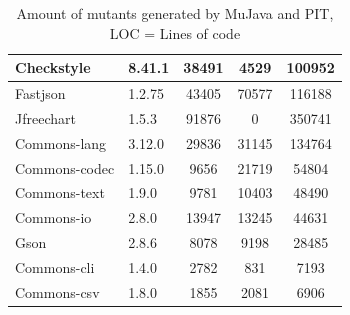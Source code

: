 \documentclass[conference,draftclsnofoot,onecolumn]{IEEEtran}
\begin{document}
\begin{table}[ht]
\begin{tabular}{|l|l|c|c|c|}
Checkstyle                      & 8.41.1           & 38491                                                                  & 4529                                 & 100952                            \\ \hline
Fastjson                        & 1.2.75           & 43405                                                                  & 70577                                & 116188                            \\ \hline
Jfreechart                      & 1.5.3            & 91876                                                                  & 0                                    & 350741                            \\ \hline
Commons-lang                    & 3.12.0           & 29836                                                                  & 31145                                & 134764                            \\ \hline
Commons-codec                   & 1.15.0           & 9656                                                                   & 21719                                & 54804                            \\ \hline
Commons-text                   & 1.9.0             & 9781                                                                   & 10403                                & 48490                            \\ \hline
Commons-io                     & 2.8.0             & 13947                                                                  & 13245                                & 44631                            \\ \hline
Gson                           & 2.8.6             & 8078                                                                   & 9198                                 & 28485                            \\ \hline
Commons-cli                    & 1.4.0             & 2782                                                                   & 831                                  & 7193                             \\ \hline
Commons-csv                    & 1.8.0             & 1855                                                                   & 2081                                 & 6906                             \\ \hline
\end{tabular}
\caption{\label{tab:mutants-generated}Amount of mutants generated by MuJava and PIT, LOC = Lines of code}
\end{table}
\end{document}
